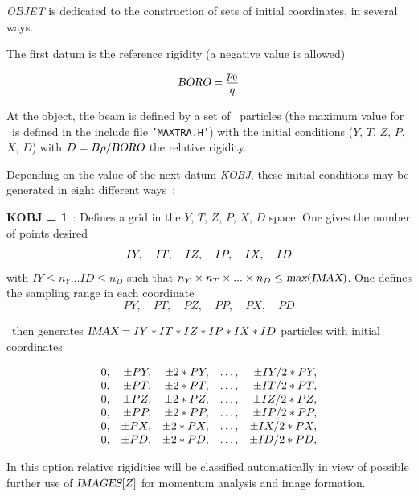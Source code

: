 \textsl{OBJET} is dedicated to the construction of sets of  initial coordinates, in several ways.  
\medskip

\noindent The first datum is the reference rigidity (a negative value is allowed)  
 
$$ \textsl{BORO} = \dfrac{p_0 }{ q}  $$

\noindent At the object, the beam is defined by a set of \IMAX\ particles 
(the maximum value for \IMAX\ is defined in the include file \texttt{'MAXTRA.H'}) with 
the initial conditions ($ Y$, $T$, $Z$, $P$, $X$, $D$)  with $ D =B\rho/\textsl{BORO}$ 
 the relative rigidity. 

\noindent Depending on the value of the next datum \textsl{KOBJ}, these initial
conditions may be generated   in eight different ways~:   
\bigskip

\noindent\textbf{KOBJ  =  1}~:  Defines a grid in the $ Y$, $T$, $Z$, $P$, $X$, $D$
 space. One gives the number of points desired 
$$	 IY,\quad IT,\quad IZ,\quad IP, \quad IX, \quad ID\\$$
with  $ IY\leq n_Y \ldots ID\leq n_D$ such that $ n_Y \times n_T \times ... \times n_D \leq \textsl{max}(\textsl{IMAX})$. 
 One defines the sampling range in each coordinate
$$	 PY,\quad PT,\quad PZ,\quad PP,\quad PX, \quad PD  $$


\noindent\zgou\  then generates 
$ \textsl{IMAX} = IY  \ast  IT  \ast  IZ \ast   IP \ast IX \ast  ID $ particles with  initial coordinates 

$$
  \begin{array}{*{5}{r<{,}}}
	  0  &  \pm PY &   \pm 2  \ast   PY & \ldots & \pm IY/2  \ast   PY \\
	  0  &  \pm PT &   \pm 2 \ast   PT  & \ldots &  \pm IT/2  \ast   PT \\
	  0  &  \pm PZ &   \pm 2 \ast  PZ   & \ldots &  \pm IZ/2 \ast PZ \\
	  0  &  \pm PP &   \pm 2  \ast PP  & \ldots  &  \pm IP/2  \ast  PP \\
	  0  &  \pm PX &   \pm 2  \ast  PX & \ldots  &  \pm IX/2 \ast   PX \\
 	  0  &  \pm PD &   \pm 2  \ast  PD & \ldots  &  \pm ID/2 \ast   PD 
 \end{array}
 $$

\medskip

\noindent In this option relative rigidities  will be classified automatically in view of possible 
further  use of $\textsl{IMAGES}[Z]$ for momentum analysis and image formation. 


